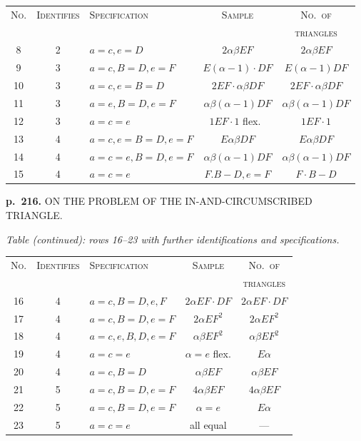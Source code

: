 \documentclass[11pt,a4paper]{book}
\begin{document}
\begin{center}
\begin{tabular}{cclcc}
\toprule
\textsc{No.} & \textsc{Identifies} & \textsc{Specification} & \textsc{Sample} & \textsc{No.\ of} \\
& & & & \textsc{triangles} \\
\midrule
8 & 2 & $a = c, e = D$ & $2 \alpha \beta EF$ & $2\alpha\beta EF$ \\
9 & 3 & $a = c, B = D, e = F$ & $E(\alpha-1)\cdot DF$ & $E(\alpha-1) DF$ \\
10 & 3 & $a = c, e = B = D$ & $2EF \cdot \alpha\beta DF$ & $2EF \cdot \alpha\beta DF$ \\
11 & 3 & $a = e, B = D, e = F$ & $\alpha\beta(\alpha-1) DF$ & $\alpha\beta(\alpha-1) DF$ \\
12 & 3 & $a = c = e$ & $1EF \cdot 1$ flex.\ & $1EF \cdot 1$ \\
13 & 4 & $a = c, e = B = D, e = F$ & $E\alpha\beta DF$ & $E\alpha\beta DF$ \\
14 & 4 & $a = c = e, B = D, e = F$ & $\alpha\beta(\alpha-1) D F$ & $\alpha\beta(\alpha-1) DF$ \\
15 & 4 & $a = c = e$ & $F.B-D, e=F$ & $F\cdot B-D$ \\
\bottomrule
\end{tabular}
\end{center}

\clearpage

\noindent
\textbf{p.~216.}  ON THE PROBLEM OF THE IN-AND-CIRCUMSCRIBED TRIANGLE.

\textit{Table (continued): rows 16--23 with further identifications and specifications.}

\begin{center}
\begin{tabular}{cclcc}
\toprule
\textsc{No.} & \textsc{Identifies} & \textsc{Specification} & \textsc{Sample} & \textsc{No.\ of} \\
& & & & \textsc{triangles} \\
\midrule
16 & 4 & $a = c, B = D, e, F$ & $2\alpha EF \cdot DF$ & $2\alpha EF \cdot DF$ \\
17 & 4 & $a = c, B = D, e = F$ & $2\alpha EF^2$ & $2\alpha EF^2$ \\
18 & 4 & $a = c, e, B, D, e = F$ & $\alpha \beta E F^2$ & $\alpha \beta E F^2$ \\
19 & 4 & $a = c = e$ & $\alpha = e$ flex. & $E \alpha$ \\
20 & 4 & $a = c, B = D$ & $\alpha\beta EF$ & $\alpha\beta EF$ \\
21 & 5 & $a = c, B = D, e = F$ & $4\alpha\beta EF$ & $4\alpha\beta EF$ \\
22 & 5 & $a = c, B = D, e = F$ & $\alpha = e$ & $E \alpha$ \\
23 & 5 & $a = c = e$ & all equal & --- \\
\bottomrule
\end{tabular}
\end{center}
\end{document}
